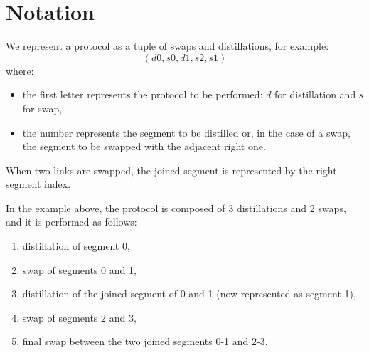 \documentclass{article}
\begin{document}
\section*{Notation}

We represent a protocol as a tuple of swaps and distillations, for example:
\begin{equation*}
    (d0, s0, d1, s2, s1)
\end{equation*}
where:
\begin{itemize}
    \item the first letter represents the protocol to be performed: \(d\) for distillation and \(s\) for swap,
    \item the number represents the segment to be distilled or, in the case of a swap, the segment to be swapped with the adjacent right one.
\end{itemize}

When two links are swapped, the joined segment is represented by the right segment index.

In the example above, the protocol is composed of 3 distillations and 2 swaps, and it is performed as follows:
\begin{enumerate}
    \item distillation of segment 0,
    \item swap of segments 0 and 1,
    \item distillation of the joined segment of 0 and 1 (now represented as segment 1),
    \item swap of segments 2 and 3,
    \item final swap between the two joined segments 0-1 and 2-3.
\end{enumerate}
\end{document}
